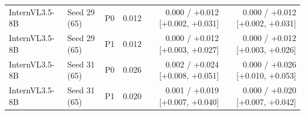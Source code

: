 \begin{table}[H]
\begin{tabular}{lllrrr}
InternVL3.5-8B & Seed 29 (65) & P0 & 0.012 & 0.000 / +0.012 [+0.002, +0.031] & 0.000 / +0.012 [+0.002, +0.031] \\
InternVL3.5-8B & Seed 29 (65) & P1 & 0.012 & 0.000 / +0.012 [+0.003, +0.027] & 0.000 / +0.012 [+0.003, +0.026] \\
InternVL3.5-8B & Seed 31 (65) & P0 & 0.026 & 0.002 / +0.024 [+0.008, +0.051] & 0.000 / +0.026 [+0.010, +0.053] \\
InternVL3.5-8B & Seed 31 (65) & P1 & 0.020 & 0.001 / +0.019 [+0.007, +0.040] & 0.000 / +0.020 [+0.007, +0.042] \\
\bottomrule
\end{tabular}
\end{table}
